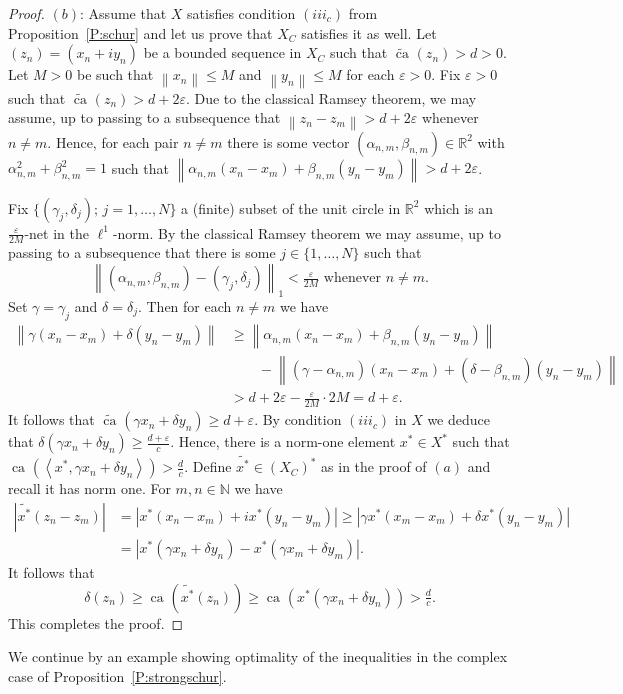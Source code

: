 \documentclass{amsart}
\numberwithin{equation}{section}
\theoremstyle{definition}
\def\ep{\varepsilon}
\def\en{\mathbb N}
\def\er{\mathbb R}
\def\ip#1#2{\left\langle#1,#2\right\rangle}
\def\de#1{\delta\left(#1\right)}
\newcommand{\norm}[1]{\left\|#1\right\|}
\newcommand{\ca}[2][]{\operatorname{ca}_{#1}\left(#2\right)}
\newcommand{\wca}[2][]{\widetilde{\operatorname{ca}}_{#1}\left(#2\right)}
\newcommand{\abs}[1]{\left|#1\right|}
\newcommand{\setsep}{;\,}
\begin{document}
\begin{proof}
$(b)$: Assume that $X$ satisfies condition $(iii_c)$ from Proposition~\ref{P:schur} and let us prove that $X_C$ satisfies it as well.  Let $(z_n)=(x_n+iy_n)$ be a bounded sequence in $X_C$ such that $\wca{z_n}>d>0$. Let $M>0$ be such that $\norm{x_n}\le M$ and $\norm{y_n}\le M$ for each $\ep>0$. Fix $\ep>0$ such that $\wca{z_n}>d+2\ep$. Due to the classical Ramsey theorem, we may assume, up to passing to a subsequence that $\norm{z_n-z_m}>d+2\ep$ whenever $n\ne m$. Hence, for each pair $n\ne m$ there is some vector $(\alpha_{n,m},\beta_{n,m})\in\er^2$ with $\alpha_{n,m}^2+\beta_{n,m}^2=1$ such that
$\norm{\alpha_{n,m} (x_n-x_m)+\beta_{n,m}(y_n-y_m)}>d+2\ep$. 

Fix $\{(\gamma_j,\delta_j)\setsep j=1,\dots,N\}$ a (finite) subset of the unit circle in $\er^2$ which is an $\frac{\ep}{2M}$-net in the $\ell^1$-norm. By the classical Ramsey theorem we may assume, up to passing to a subsequence that there is some $j\in\{1,\dots,N\}$ such that
$$\norm{(\alpha_{n,m},\beta_{n,m})-(\gamma_j,\delta_j)}_1<\tfrac{\ep}{2M} \mbox{ whenever }n\ne m.$$
Set $\gamma=\gamma_j$ and $\delta=\delta_j$. Then for each $n\ne m$ we have
$$\begin{aligned}
 \norm{\gamma(x_n-x_m)+\delta(y_n-y_m)}&\ge  \norm{\alpha_{n,m} (x_n-x_m)+\beta_{n,m}(y_n-y_m)}\\&\qquad-\norm{(\gamma-\alpha_{n,m}) (x_n-x_m)+(\delta-\beta_{n,m})(y_n-y_m)}\\&>
 d+2\ep-\tfrac{\ep}{2M}\cdot 2M=d+\ep.
\end{aligned}$$
It follows that $\wca{\gamma x_n+\delta y_n}\ge d+\ep$. By condition $(iii_c)$ in $X$ we deduce that $\de{\gamma x_n+\delta y_n}\ge \frac{d+\ep}{c}$. Hence, there is a norm-one element $x^*\in X^*$ such that
$\ca{\ip{x^*}{\gamma x_n+\delta y_n}}>\frac dc$. Define $\widetilde{x^*}\in (X_C)^*$ as in the proof of $(a)$ and recall it has norm one. For $m,n\in\en$ we have
$$\begin{aligned}
\abs{\widetilde{x^*}(z_n-z_m)}&=\abs{x^*(x_n-x_m)+ix^*(y_n-y_m)}
\ge \abs{\gamma x^*(x_m-x_m)+\delta x^*(y_n-y_m)}
\\&=\abs{x^*(\gamma x_n+\delta y_n)-x^*(\gamma x_m+\delta y_m)}.
\end{aligned}$$
It follows that 
$$\de{z_n}\ge \ca{\widetilde{x^*}(z_n)}\ge \ca{x^*(\gamma x_n+\delta y_n)}>\tfrac dc.$$
This completes the proof.


\end{proof}

We continue by an example showing optimality of the inequalities in the complex case of Proposition~\ref{P:strongschur}.
\end{document}

